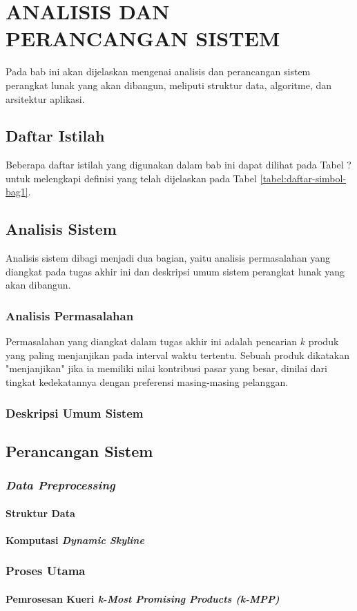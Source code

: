 \chapter{ANALISIS DAN PERANCANGAN SISTEM} \label{chapter:analisis dan perancangan sistem}
\tab Pada bab ini akan dijelaskan mengenai analisis dan perancangan sistem perangkat lunak yang akan dibangun, meliputi struktur data, algoritme, dan arsitektur aplikasi. 

\section{Daftar Istilah}
\tab Beberapa daftar istilah yang digunakan dalam bab ini dapat dilihat pada Tabel ? untuk melengkapi definisi yang telah dijelaskan pada Tabel \ref{tabel:daftar-simbol-bag1}.

\section{Analisis Sistem}
\tab Analisis sistem dibagi menjadi dua bagian, yaitu analisis permasalahan yang diangkat pada tugas akhir ini dan deskripsi umum sistem perangkat lunak yang akan dibangun.

\subsection{Analisis Permasalahan}
\tab Permasalahan yang diangkat dalam tugas akhir ini adalah pencarian $k$ produk yang paling menjanjikan pada interval waktu tertentu. Sebuah produk dikatakan "menjanjikan" jika ia memiliki nilai kontribusi pasar yang besar, dinilai dari tingkat kedekatannya dengan preferensi masing-masing pelanggan.

\subsection{Deskripsi Umum Sistem}
\tab 

\section{Perancangan Sistem}
\subsection{\textit{Data Preprocessing}}
\subsubsection{Struktur Data}
\subsubsection{Komputasi \textit{Dynamic Skyline}}
\subsection{Proses Utama}
\subsubsection{Pemrosesan Kueri \textit{k-Most Promising Products (k-MPP)}}
